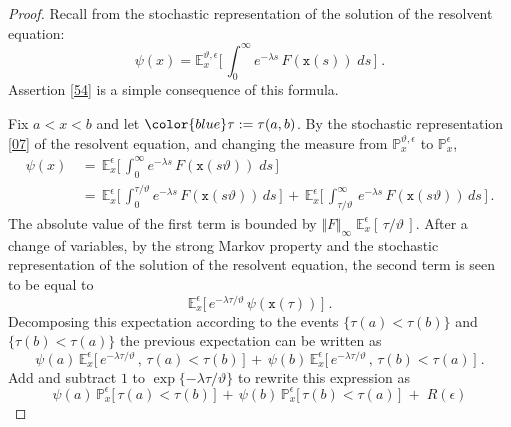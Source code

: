 \documentclass[reqno]{amsart}
\theoremstyle{plain}
\theoremstyle{definition}
\newcommand{\bb}[1]{{\mathbb #1}}
\newcommand{\mtt}[1]{{\mathtt #1}}
\newcounter{as}[section]
\newcommand{\<}{\langle}
\renewcommand{\>}{\rangle}
\begin{document}
\begin{proof}
Recall from \cite[Section 6.5]{Fri} the stochastic representation of
the solution of the resolvent equation:
\begin{equation}
\label{07}
\psi(x) = \bb
E^{\vartheta, \epsilon}_{x}\Big[\, \int_{0}^{\infty}e^{-\lambda s}\,
F ( \mtt x (s)) \; ds\,\Big]\;.
\end{equation}
Assertion \eqref{54} is a simple consequence of this formula.

Fix $a < x < b$ and let $\color{blue} \tau := \tau(a,b)$. By the
stochastic representation \eqref{07} of the resolvent equation, and
changing the measure from $\bb P^{\vartheta, \epsilon}_{x}$ to
$\bb P^{\epsilon}_{x}$, 
\begin{equation*}
\begin{aligned}
\psi(x) \, & =\, \bb E^{\epsilon}_{x}\Big[\,
\int_{0}^{\infty}e^{-\lambda s}\, F ( \mtt x (s\vartheta)) \;
ds\,\Big]
\\
\, & =\, \bb E^{\epsilon}_{x}\Big[\,
\int_{0}^{\tau/\vartheta}e^{-\lambda
s}\, F(\mtt x(s\vartheta) )\, ds\, \Big]
\,+\, \bb
E^{\epsilon}_{x}\Big[\, \int_{\tau/\vartheta}^{\infty}
\,  e^{-\lambda s}\,  F(\mtt x(s\vartheta) )\, ds\,
\Big]\, .
\end{aligned}
\end{equation*}
The absolute value of the first term is bounded by
$\Vert F \Vert_\infty \; \bb E^{\epsilon}_{x} [\, \tau/\vartheta \,
]$.  After a change of variables, by the strong Markov property and
the stochastic representation of the solution of the resolvent
equation, the second term is seen to be equal to
\begin{equation*}
\bb E^{\epsilon}_{x}\big[\,
e^{-\lambda \tau/\vartheta}\, 
\psi (\mtt x (\tau))\,\big]\;.
\end{equation*}
Decomposing this expectation according to the events
$\{\tau(a)< \tau(b) \}$ and
$\{\tau(b)< \tau(a) \}$ the previous expectation
can be written as
\begin{equation*}
\psi (a) \, \bb E^{\epsilon}_{x}\big[\,
e^{-\lambda \tau/\vartheta}
\,,\, \tau(a)< \tau(b)\, \big]
\,+\,
\psi (b) \, \bb E^{\epsilon}_{x}\big[\,
e^{-\lambda \tau/\vartheta}
\,,\, \tau(b)< \tau(a)\, \big]
\;.
\end{equation*}
Add and subtract $1$ to $\exp \{-\lambda \tau/\vartheta\}$ to
rewrite this expression as
\begin{equation}
\label{59}
\psi (a) \, \bb P^{\epsilon}_{x}\big[\,
\tau(a)< \tau(b)\, \big]
\,+\,
\psi (b) \, \bb P^{\epsilon}_{x}\big[\, 
\tau(b)< \tau(a)\, \big] \;+\; R(\epsilon)

\end{equation}
\end{proof}
\end{document}

